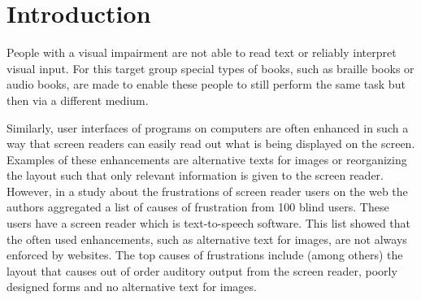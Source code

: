 \section{Introduction}
People with a visual impairment are not able to read text or reliably interpret visual input. For this target group special types of books, such as braille books or audio books, are made to enable these people to still perform the same task but then via a different medium. 

Similarly, user interfaces of programs on computers are often enhanced in such a way that screen readers can easily read out what is being displayed on the screen. Examples of these enhancements are alternative texts for images or reorganizing the layout such that only relevant information is given to the screen reader. However, in a study about the frustrations of screen reader users on the web the authors \cite{lazar2007frustrates} aggregated a list of causes of frustration from 100 blind users. These users have a screen reader which is text-to-speech software. This list showed that the often used enhancements, such as alternative text for images, are not always enforced by websites. The top causes of frustrations include (among others) the layout that causes out of order auditory output from the screen reader, poorly designed forms and no alternative text for images. 

